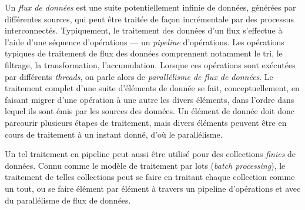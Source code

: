 




Un \emph{flux de donn\'ees} est une suite potentiellement infinie de donn\'ees, g\'en\'er\'ees par diff\'erentes sources, qui peut \^etre trait\'ee de fa\c{c}on incr\'ementale par des processus interconnect\'es. Typiquement, le traitement des donn\'ees d'un flux s'effectue \`a l'aide d'une s\'equence d'op\'erations --- un \emph{pipeline} d'op\'erations. Les op\'erations typiques de traitement de flux des donn\'ees comprennent notamment le tri, le filtrage,  la transformation, l'accumulation. Lorsque ces op\'erations sont ex\'ecut\'ees par diff\'erents \emph{threads}, on parle alors de \emph{parall\'elisme de flux de donn\'ees}. Le traitement complet d'une suite d'\'el\'ements de donn\'ee se fait, conceptuellement, en faisant migrer d'une op\'eration \`a une autre les divers \'el\'ements, dans l'ordre dans lequel ils sont \'emis par les sources des donn\'ees.
%
Un \'el\'ement de donn\'ee doit donc parcourir plusieurs \'etapes de traitement, mais divers \'el\'ements peuvent \^etre en cours de traitement \`a un instant donn\'e, d'o\`u le parall\'elisme.

Un tel traitement en pipeline peut aussi \^etre utilis\'e pour des collections \emph{finies} de donn\'ees. Connu comme le mod\`ele de traitement par lots (\emph{batch processing}), le traitement de telles collections peut se faire en traitant chaque collection comme un tout, ou se faire \'el\'ement par \'el\'ement \`a travers un pipeline d'op\'erations et avec du parall\'elisme de flux de donn\'ees.

